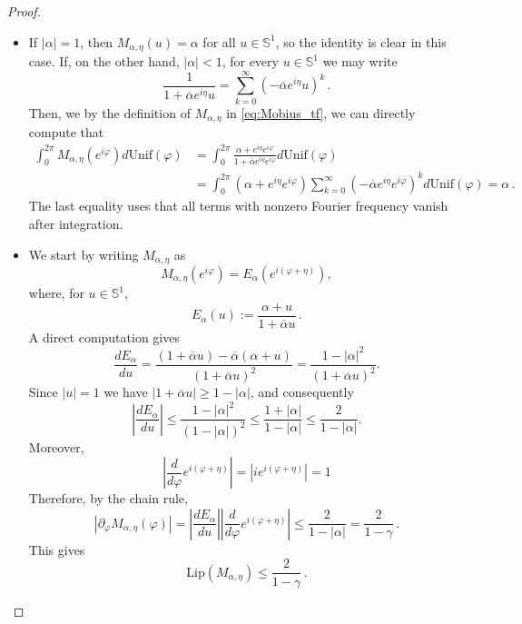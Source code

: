 \documentclass[10pt]{article}
\theoremstyle{definition}
\theoremstyle{definition}
\numberwithin{equation}{section}
\newcommand{\BBS}{\mathbb{S}}
\renewcommand{\S}{\mathbb{S}}
\newcommand{\alphaBar}{\overline{\alpha}}
\newcommand{\Unif}{\mathrm{Unif}}
\begin{document}
\begin{proof}
\begin{itemize}
    \item[(i).]
    If $|\alpha| = 1$, then $M_{\alpha, \eta}(u) = \alpha $ for all $u \in \S^1$, so the identity is clear in this case.  If, on the other hand, $|\alpha| < 1$, for every $u \in \BBS^1$ we may write
    \begin{equation*}
    \frac{1}{1 + \alphaBar e^{i\eta} u} = \sum_{k=0}^{\infty} (-\alphaBar e^{i\eta} u)^k \, .
    \end{equation*}
    Then, we by the definition of $M_{\alpha, \eta}$ in \eqref{eq:Mobius_tf}, we can directly compute that
    \begin{equation*}
    \begin{aligned}
    \int_0^{2\pi} M_{\alpha,\eta} (e^{i\varphi}) d \Unif(\varphi) &= \int_0^{2\pi} \frac{\alpha + e^{i\eta} e^{i\varphi}}{1 + \alphaBar e^{i\eta} e^{i\varphi}} d\Unif(\varphi) \\
    &= \int_0^{2\pi} (\alpha + e^{i\eta} e^{i\varphi}) \sum_{k=0}^{\infty} (-\alphaBar e^{i\eta} e^{i\varphi})^k d\Unif(\varphi) = \alpha \, .
    \end{aligned}
    \end{equation*}
    The last equality uses that all terms with nonzero Fourier frequency vanish after integration.

    \item[(ii).] We start by writing $M_{\alpha, \eta}$ as
    \begin{equation*}
    M_{\alpha, \eta} (e^{i\varphi}) = E_{\alpha} (e^{i(\varphi + \eta)}),
    \end{equation*}
    where, for $u \in \BBS^1$,
    \begin{equation*}
       E_{\alpha}(u) := \frac{\alpha + u}{1 + \alphaBar u} \, . 
    \end{equation*}
    A direct computation gives
    \[
    \frac{dE_{\alpha}}{du}=\frac{(1+\overline{\alpha} u)-\overline{\alpha}(\alpha+u)}{(1+\overline{\alpha} u)^2}
    =\frac{1-|\alpha|^2}{(1+\overline{\alpha} u)^2}.
    \]
    Since $|u|=1$ we have $|1+\overline{\alpha} u|\ge 1-|\alpha|$, and consequently
    \[
    \left|\frac{dE_{\alpha}}{du}\right|
    \le \frac{1-|\alpha|^2}{(1-|\alpha|)^2}
    \le \frac{1+|\alpha|}{1-|\alpha|}
    \le \frac{2}{1-|\alpha|}.
    \]
    Moreover, 
    \begin{equation*}
        \left|\frac{d}{d\varphi} e^{i(\varphi + \eta)} \right| = |i e^{i(\varphi + \eta)}| = 1
    \end{equation*}
    Therefore, by the chain rule, 
    \[
    |\partial_\varphi M_{\alpha,\eta}(\varphi)|
    =\left|\frac{dE_{\alpha}}{du}\right|\left|\frac{d}{d\varphi} e^{i(\varphi + \eta)}\right|
    \le \frac{2}{1-|\alpha|} = \frac{2}{1 - \gamma} \, .
    \]
    This gives 
    $$\mathrm{Lip}(M_{\alpha,\eta})\le \frac{2}{1 - \gamma} \, .$$
\end{itemize}
\end{proof}
\end{document}
